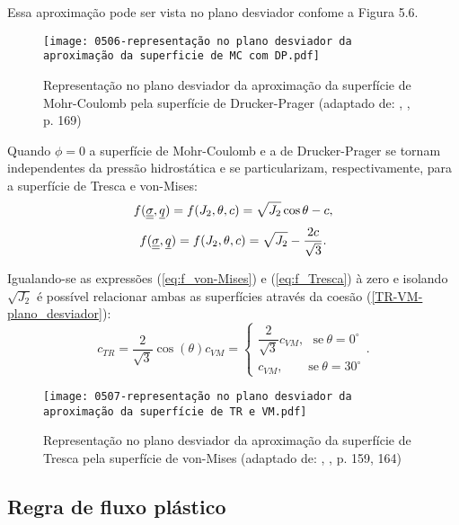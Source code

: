 Essa aproximação pode ser vista no plano desviador confome a Figura 5.6.
\begin{figure}[H]
	\begin{center}
		\texttt{[image: 0506-representação no plano desviador da aproximação da superficie de MC com DP.pdf]}
	\end{center}
	\caption{\label{DP-MC-plano_desviador}Representação no plano desviador da aproximação da superfície de Mohr-Coulomb pela superfície de Drucker-Prager  (adaptado de: \citeauthor{Neto2008}, \citeyear{Neto2008}, p. 169)}
\end{figure}
Quando $\phi = 0$ a superfície de Mohr-Coulomb e a de Drucker-Prager se tornam independentes da pressão hidrostática e se particularizam, respectivamente, para a superfície de Tresca e von-Mises:
\begin{equation}
	\label{eq:f_Tresca}
	f(\underline{\underline \sigma},\underline q) = f(J_2,\theta,c) = \sqrt{J_2}\cos{\theta} - c,
\end{equation}
\begin{equation}
	\label{eq:f_von-Mises}
	f(\underline{\underline \sigma},\underline q) = f(J_2,\theta,c) = \sqrt{J_2} - \dfrac{2c}{\sqrt{3}}.
\end{equation}

Igualando-se as expressões (\ref{eq:f_von-Mises}) e (\ref{eq:f_Tresca}) à zero e isolando $\sqrt{J_2}$ é possível relacionar ambas as superfícies através da coesão (\autoref{TR-VM-plano_desviador}):
\begin{equation}
	\label{eq:ctr_cvm}
	c_{TR} = \dfrac{2}{\sqrt{3}}\cos(\theta)c_{VM} = \left\{
	\begin{array}{lcl}
		\dfrac{2}{\sqrt{3}}c_{VM}, ~~~\text{se}~\theta = 0^\circ \\ 
		c_{VM},~~~~~~~~~\text{se}~\theta = 30^\circ
	\end{array}
	\right..
\end{equation}
\begin{figure}[H]
	\begin{center}
		\texttt{[image: 0507-representação no plano desviador da aproximação da superfície de TR e VM.pdf]}
	\end{center}
	\caption{\label{TR-VM-plano_desviador}Representação no plano desviador da aproximação da superfície de Tresca pela superfície de von-Mises (adaptado de: \citeauthor{Neto2008}, \citeyear{Neto2008}, p. 159, 164)}
\end{figure}

\subsection{Regra de fluxo plástico}

